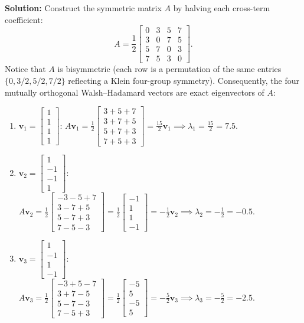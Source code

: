 \documentclass[11pt, letterpaper]{article}
\theoremstyle{definition}
\theoremstyle{remark}
\begin{document}
\textbf{Solution:}
Construct the symmetric matrix $A$ by halving each cross-term coefficient:
\[
A = \frac{1}{2} \begin{bmatrix} 0 & 3 & 5 & 7 \\ 3 & 0 & 7 & 5 \\ 5 & 7 & 0 & 3 \\ 7 & 5 & 3 & 0 \end{bmatrix}.
\]
Notice that $A$ is bisymmetric (each row is a permutation of the same entries $\{0, 3/2, 5/2, 7/2\}$ reflecting a Klein four-group symmetry). Consequently, the four mutually orthogonal Walsh–Hadamard vectors are exact eigenvectors of $A$:
\begin{enumerate}[label=(\arabic*)]
    \item $\mathbf{v}_1 = \begin{bmatrix} 1 \\ 1 \\ 1 \\ 1 \end{bmatrix}$: \quad $A\mathbf{v}_1 = \frac{1}{2}\begin{bmatrix} 3+5+7 \\ 3+7+5 \\ 5+7+3 \\ 7+5+3 \end{bmatrix} = \frac{15}{2}\mathbf{v}_1 \implies \lambda_1 = \frac{15}{2} = 7.5$.
    \item $\mathbf{v}_2 = \begin{bmatrix} 1 \\ -1 \\ -1 \\ 1 \end{bmatrix}$: \quad $A\mathbf{v}_2 = \frac{1}{2}\begin{bmatrix} -3-5+7 \\ 3-7+5 \\ 5-7+3 \\ 7-5-3 \end{bmatrix} = \frac{1}{2}\begin{bmatrix} -1 \\ 1 \\ 1 \\ -1 \end{bmatrix} = -\frac{1}{2}\mathbf{v}_2 \implies \lambda_2 = -\frac{1}{2} = -0.5$.
    \item $\mathbf{v}_3 = \begin{bmatrix} 1 \\ -1 \\ 1 \\ -1 \end{bmatrix}$: \quad $A\mathbf{v}_3 = \frac{1}{2}\begin{bmatrix} -3+5-7 \\ 3+7-5 \\ 5-7-3 \\ 7-5+3 \end{bmatrix} = \frac{1}{2}\begin{bmatrix} -5 \\ 5 \\ -5 \\ 5 \end{bmatrix} = -\frac{5}{2}\mathbf{v}_3 \implies \lambda_3 = -\frac{5}{2} = -2.5$.

\end{enumerate}
\end{document}
